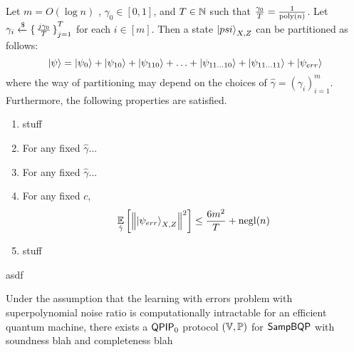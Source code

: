 \begin{lem}
	Let $m=O(\log n)$ , $\gamma_0\in[0, 1]$, and $T\in\mathbb{N}$ such that $\frac{\gamma_0}{T}=\frac{1}{\operatorname*{\operatorname{poly}}(n)}$.
	Let $\gamma_i\xleftarrow{\$}\set{\frac{j\gamma_0}{T}}^T_{j=1}$  for each $i\in[m]$.
	Then a state $\ket{psi}_{X, Z}$ can be partitioned as follows: 
	$$\ket{\psi}=\ket{\psi_0}+\ket{\psi_{10}}+\ket{\psi_{110}}+\ldots+\ket{\psi_{11\ldots10}}+\ket{\psi_{11\ldots11}}+\ket{\psi_{err}}$$
	where the way of partitioning may depend on the choices of $\hat\gamma=(\gamma_i)_{i=1}^m$.
	Furthermore, the following properties are satisfied. 
	\begin{enumerate}
		\item stuff
		\item For any fixed $\hat\gamma$... 
		\item For any fixed $\hat\gamma$...
		\item For any fixed $c$,
			$$\operatorname*{\mathbb{E}}_{\hat\gamma}\left[\left\lVert\ket{\psi_{err}}_{X,Z}\right\rVert^2\right]\leq\frac{6m^2}{T}+\operatorname{negl}(n)$$
		\item stuff
	\end{enumerate}
\end{lem}
    asdf




\begin{cor}
    
	Under the assumption that the learning with errors problem with superpolynomial noise ratio is computationally intractable for an efficient quantum machine, there exists a $\operatorname{\mathsf{QPIP}}_0$ protocol $(\mathbb{V}, \mathbb{P})$ for $\operatorname{\mathsf{SampBQP}}$ with soundness blah and completeness blah
	
\end{cor}
